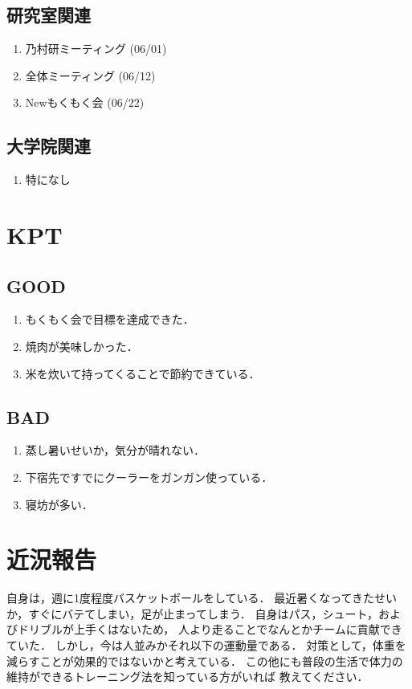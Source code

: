 \documentclass[fleqn, 14pt]{extarticlej}
\begin{document}
  \subsection{研究室関連}
  \begin{enumerate}
   \item 乃村研ミーティング
         \hfill
         (06/01)
   \item 全体ミーティング
         \hfill
         (06/12)
   \item Newもくもく会
         \hfill
         (06/22)
  \end{enumerate}

  \subsection{大学院関連}
  \begin{enumerate}
      \item 特になし
  \end{enumerate}

\section{KPT}
  \subsection{GOOD}
  \begin{enumerate}
   \item もくもく会で目標を達成できた．
   \item 焼肉が美味しかった．
   \item 米を炊いて持ってくることで節約できている．
  \end{enumerate}

  \subsection{BAD}
  \begin{enumerate}
   \item 蒸し暑いせいか，気分が晴れない．
   \item 下宿先ですでにクーラーをガンガン使っている．
   \item 寝坊が多い．
  \end{enumerate}

\section{近況報告}
自身は，週に1度程度バスケットボールをしている．
最近暑くなってきたせいか，すぐにバテてしまい，足が止まってしまう．
自身はパス，シュート，およびドリブルが上手くはないため，
人より走ることでなんとかチームに貢献できていた．
しかし，今は人並みかそれ以下の運動量である．
対策として，体重を減らすことが効果的ではないかと考えている．
この他にも普段の生活で体力の維持ができるトレーニング法を知っている方がいれば
教えてください．
\end{document}
